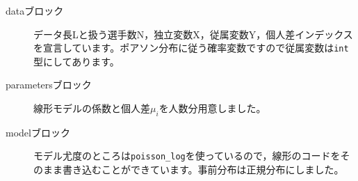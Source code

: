 \begin{description}
	\item[dataブロック] データ長Lと扱う選手数N，独立変数X，従属変数Y，個人差インデックスを宣言しています。ポアソン分布に従う確率変数ですので従属変数は\verb|int|型にしてあります。
	\item[parametersブロック] 線形モデルの係数と個人差$\mu_i$を人数分用意しました。
	\item[modelブロック] モデル尤度のところは\verb|poisson_log|を使っているので，線形のコードをそのまま書き込むことができています。事前分布は正規分布にしました。
\end{description}
